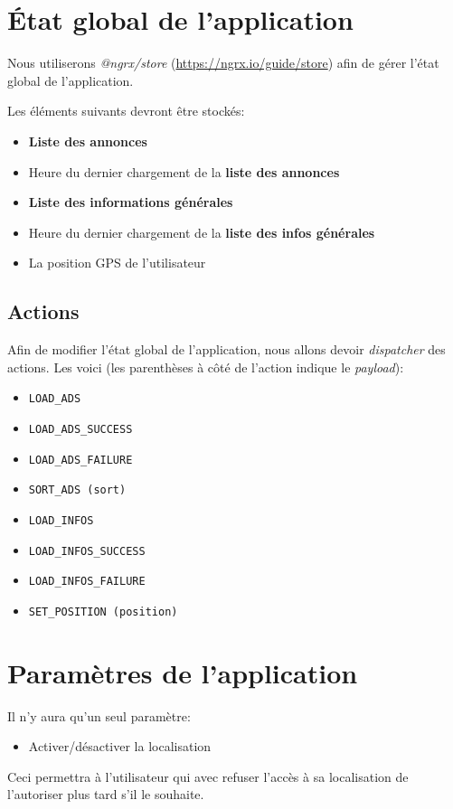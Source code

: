 \documentclass[french]{report}
\begin{document}
\section{État global de l'application}
Nous utiliserons \textit{@ngrx/store} (\url{https://ngrx.io/guide/store}) afin de 
gérer l'état global de l'application.

Les éléments suivants devront être stockés:
\begin{itemize}
    \item \textbf{Liste des annonces}
    \item Heure du dernier chargement de la \textbf{liste des annonces}
    \item \textbf{Liste des informations générales}
    \item Heure du dernier chargement de la \textbf{liste des infos générales}
    \item La position GPS de l'utilisateur
\end{itemize}

\subsection{Actions}
Afin de modifier l'état global de l'application, nous allons devoir \textit{dispatcher}
des actions. Les voici (les parenthèses à côté de l'action indique le \textit{payload}):
\begin{itemize}
    \item \verb|LOAD_ADS|
    \item \verb|LOAD_ADS_SUCCESS|
    \item \verb|LOAD_ADS_FAILURE|
    \item \verb|SORT_ADS (sort)|
    \item \verb|LOAD_INFOS|
    \item \verb|LOAD_INFOS_SUCCESS|
    \item \verb|LOAD_INFOS_FAILURE|
    \item \verb|SET_POSITION (position)|
\end{itemize}

\section{Paramètres de l'application}
Il n'y aura qu'un seul paramètre:
\begin{itemize}
    \item Activer/désactiver la localisation
\end{itemize}
Ceci permettra à l'utilisateur qui avec refuser l'accès à sa localisation de
l'autoriser plus tard s'il le souhaite.
\end{document}
